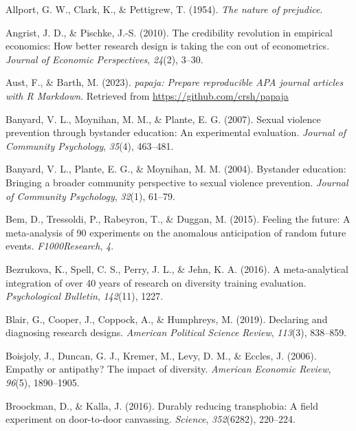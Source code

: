 \documentclass[
  man]{apa6}
\newlength{\cslhangindent}
\newenvironment{CSLReferences}[2] %
 {\begin{list}{}{%
  \setlength{\itemindent}{0pt}
  \setlength{\leftmargin}{0pt}
  \setlength{\parsep}{0pt}
  \ifodd #1
   \setlength{\leftmargin}{\cslhangindent}
   \setlength{\itemindent}{-1\cslhangindent}
  \fi
  \setlength{\itemsep}{#2\baselineskip}}}
 {\end{list}}
\begin{document}
\label{refs}
\begin{CSLReferences}{1}{0}
Allport, G. W., Clark, K., \& Pettigrew, T. (1954). \emph{The nature of prejudice}.

Angrist, J. D., \& Pischke, J.-S. (2010). The credibility revolution in empirical economics: How better research design is taking the con out of econometrics. \emph{Journal of Economic Perspectives}, \emph{24}(2), 3--30.

Aust, F., \& Barth, M. (2023). \emph{{papaja}: {Prepare} reproducible {APA} journal articles with {R Markdown}}. Retrieved from \url{https://github.com/crsh/papaja}

Banyard, V. L., Moynihan, M. M., \& Plante, E. G. (2007). Sexual violence prevention through bystander education: An experimental evaluation. \emph{Journal of Community Psychology}, \emph{35}(4), 463--481.

Banyard, V. L., Plante, E. G., \& Moynihan, M. M. (2004). Bystander education: Bringing a broader community perspective to sexual violence prevention. \emph{Journal of Community Psychology}, \emph{32}(1), 61--79.

Bem, D., Tressoldi, P., Rabeyron, T., \& Duggan, M. (2015). Feeling the future: A meta-analysis of 90 experiments on the anomalous anticipation of random future events. \emph{F1000Research}, \emph{4}.

Bezrukova, K., Spell, C. S., Perry, J. L., \& Jehn, K. A. (2016). A meta-analytical integration of over 40 years of research on diversity training evaluation. \emph{Psychological Bulletin}, \emph{142}(11), 1227.

Blair, G., Cooper, J., Coppock, A., \& Humphreys, M. (2019). Declaring and diagnosing research designs. \emph{American Political Science Review}, \emph{113}(3), 838--859.

Boisjoly, J., Duncan, G. J., Kremer, M., Levy, D. M., \& Eccles, J. (2006). Empathy or antipathy? The impact of diversity. \emph{American Economic Review}, \emph{96}(5), 1890--1905.

Broockman, D., \& Kalla, J. (2016). Durably reducing transphobia: A field experiment on door-to-door canvassing. \emph{Science}, \emph{352}(6282), 220--224.


\end{CSLReferences}
\end{document}
